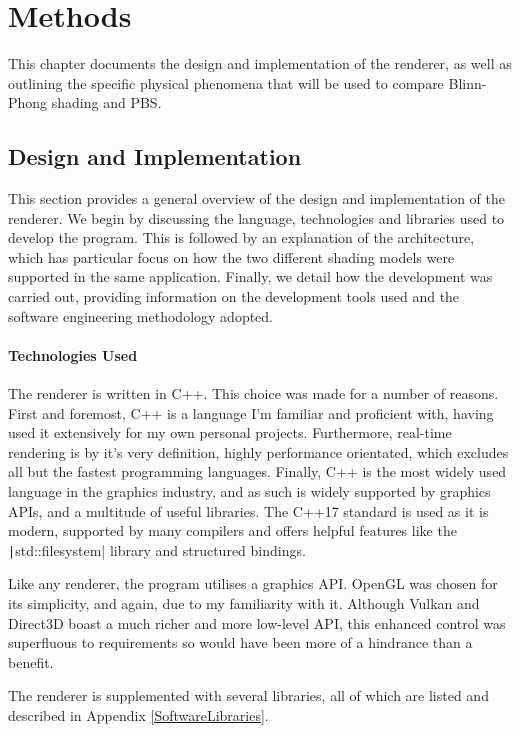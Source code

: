\chapter{Methods}
\label{chapter2}

This chapter documents the design and implementation of the renderer, as well as outlining the specific physical phenomena that will be used to compare Blinn-Phong shading and PBS.

\section{Design and Implementation}

This section provides a general overview of the design and implementation of the renderer. We begin by discussing the language, technologies and libraries used to develop the program. This is followed by an explanation of the architecture, which has particular focus on how the two different shading models were supported in the same application. Finally, we detail how the development was carried out, providing information on the development tools used and the software engineering methodology adopted.

\subsubsection{Technologies Used}

The renderer is written in C++. This choice was made for a number of reasons. First and foremost, C++ is a language I'm familiar and proficient with, having used it extensively for my own personal projects. Furthermore, real-time rendering is by it's very definition, highly performance orientated, which excludes all but the fastest programming languages. Finally, C++ is the most widely used language in the graphics industry, and as such is widely supported by graphics APIs, and a multitude of useful libraries. The C++17 standard is used as it is modern, supported by many compilers and offers helpful features like the \texttt|std::filesystem| library and structured bindings.

Like any renderer, the program utilises a graphics API. OpenGL was chosen for its simplicity, and again, due to my familiarity with it. Although Vulkan and Direct3D boast a much richer and more low-level API, this enhanced control was superfluous to requirements so would have been more of a hindrance than a benefit.

The renderer is supplemented with several libraries, all of which are listed and described in Appendix \ref{SoftwareLibraries}.

